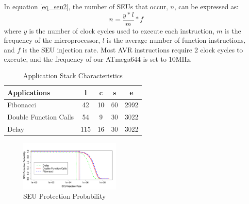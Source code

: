 In equation \ref{eq_seu2}, the number of SEUs that occur, $n$, can be expressed as:
\begin{equation}
n = \frac{y*l}{m}*f
\end{equation}
where $y$ is the number of clock cycles used to execute each instruction, $m$ is the frequency of the microprocessor, $l$ is the average number of function instructions, and $f$ is the SEU injection rate. Most AVR instructions require 2 clock cycles to execute, and the frequency of our ATmega644 is set to 10MHz.

\begin{table}
	\center
    \begin{tabular}{|l|c|c|c|c|}
    \hline
    \textbf{ Applications}   & \textbf{l} & \textbf{c} & \textbf{s} & \textbf{e}	\\ \hline
    Fibonacci             		& 42			& 10		& 60	   	& 2992		\\
\hline
    Double Function Calls       & 54			& 9			& 30        & 3022		\\ \hline
    Delay         				& 115			& 16		& 30		& 3022		\\
 \hline
    \end{tabular}
    \caption {Application Stack Characteristics}
    \label{tbl_application_parameters}
\end{table}
\begin{figure}
\centering
\includegraphics[width=0.45\textwidth]{figures/success_probability_v2.pdf}
\caption{SEU Protection Probability}
\vspace{-15pt}
\label{fig:success_probability}
\end{figure}
